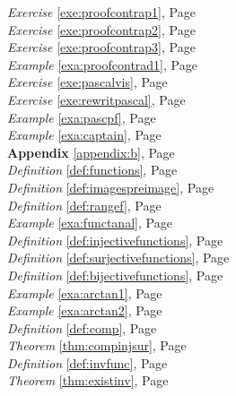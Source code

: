 \begin{multicols}{3}
\begin{center}
      \textit{Exercise} \ref{exe:proofcontrap1}, Page \pageref{exe:proofcontrap1} \\
      \textit{Exercise} \ref{exe:proofcontrap2}, Page \pageref{exe:proofcontrap2} \\
      \textit{Exercise} \ref{exe:proofcontrap3}, Page \pageref{exe:proofcontrap3} \\
      \textit{Example} \ref{exa:proofcontrad1}, Page \pageref{exa:proofcontrad1} \\
      \textit{Exercise} \ref{exe:pascalvis}, Page \pageref{exe:pascalvis} \\
      \textit{Exercise} \ref{exe:rewritpascal}, Page \pageref{exe:rewritpascal} \\
      \textit{Example} \ref{exa:pascpf}, Page \pageref{exa:pascpf} \\
      \textit{Example} \ref{exa:captain}, Page \pageref{exa:captain} \\
      \textbf{Appendix} \ref{appendix:b}, Page \pageref{appendix:b} \\
      \textit{Definition} \ref{def:functions}, Page \pageref{def:functions} \\
      \textit{Definition} \ref{def:imagespreimage}, Page \pageref{def:imagespreimage} \\
      \textit{Definition} \ref{def:rangef}, Page \pageref{def:rangef} \\
      \textit{Example} \ref{exa:functanal}, Page \pageref{exa:functanal} \\
      \textit{Definition} \ref{def:injectivefunctions}, Page \pageref{def:injectivefunctions} \\
      \textit{Definition} \ref{def:surjectivefunctions}, Page \pageref{def:surjectivefunctions} \\
      \textit{Definition} \ref{def:bijectivefunctions}, Page \pageref{def:bijectivefunctions} \\
      \textit{Example} \ref{exa:arctan1}, Page \pageref{exa:arctan1} \\
      \textit{Example} \ref{exa:arctan2}, Page \pageref{exa:arctan2} \\
      \textit{Definition} \ref{def:comp}, Page \pageref{def:comp} \\
      \textit{Theorem} \ref{thm:compinjsur}, Page \pageref{thm:compinjsur} \\
      \textit{Definition} \ref{def:invfunc}, Page \pageref{def:invfunc} \\
      \textit{Theorem} \ref{thm:existinv}, Page \pageref{thm:existinv} \\

\end{center}
\end{multicols}
